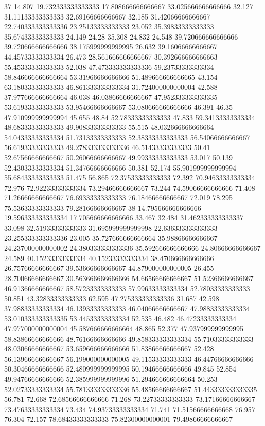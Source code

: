 37 14.807 19.732333333333333 17.808666666666667 33.025666666666666 32.127 31.11133333333333 32.69166666666667 32.185 31.42066666666667 22.740333333333336 23.25133333333333 23.052 35.39833333333333 35.67433333333333 24.149 24.28 35.308 24.832 24.548 39.720666666666666 39.720666666666666 38.175999999999995 26.632 39.16066666666667 44.45733333333334 26.473 28.561666666666667 30.392666666666663 55.45333333333333 52.038 47.473333333333336 59.23733333333334 58.846666666666664 53.31966666666666 51.489666666666665 43.154 63.18033333333333 46.861333333333334 31.724000000000004 42.588 37.977666666666664 46.038 46.03866666666667 47.952333333333335 53.61933333333333 53.95466666666667 53.080666666666666 46.391 46.35 47.910999999999994 45.655 48.84 52.78333333333333 47.833 59.34133333333334 48.68333333333333 49.90833333333333 55.515 48.032666666666664 54.04333333333334 51.73133333333333 52.38333333333333 56.54066666666667 56.61933333333333 49.278333333333336 46.51433333333333 50.41 52.67566666666667 50.26066666666667 49.99333333333333 53.017 50.139 52.43033333333334 51.34766666666666 50.381 52.174 55.901999999999994 55.68433333333333 51.475 56.865 72.37533333333333 72.392 70.94633333333334 72.976 72.92233333333334 73.29466666666667 73.244 74.59066666666666 71.408 71.26666666666667 76.69333333333333 76.18466666666667 72.019 78.295 75.53633333333333 79.28166666666667
38 14.795666666666666 19.596333333333334 17.705666666666666 33.467 32.484 31.462333333333337 33.098 32.51933333333333 31.695999999999998 22.636333333333333 23.255333333333336 23.005 35.727666666666664 35.98866666666667 24.237000000000002 24.380333333333336 35.592666666666666 24.80666666666667 24.589 40.15233333333334 40.15233333333334 38.470666666666666 26.75766666666667 39.53666666666667 44.879000000000005 26.455 28.70066666666667 30.563666666666666 54.66566666666667 51.52366666666667 46.91366666666667 58.57233333333333 57.99633333333334 52.78033333333333 50.851 43.32833333333333 62.595 47.275333333333336 31.687 42.598 37.98833333333334 46.13933333333333 46.04066666666667 47.98833333333334 53.010333333333335 53.44533333333334 52.535 46.482 46.47233333333334 47.977000000000004 45.587666666666664 48.865 52.377 47.937999999999995 58.83866666666666 48.76166666666666 49.858333333333334 55.71033333333333 48.03066666666667 53.659666666666666 51.83866666666667 52.428 56.13966666666667 56.199000000000005 49.11533333333333 46.44766666666666 50.30466666666666 52.480999999999995 50.19466666666666 49.845 52.854 49.94766666666666 52.385999999999996 51.294666666666664 50.253 52.02733333333334 55.781333333333336 55.48566666666667 51.443333333333335 56.781 72.668 72.68566666666666 71.268 73.22733333333333 73.17166666666667 73.47633333333334 73.434 74.93733333333334 71.741 71.51566666666668 76.957 76.304 72.157 78.68433333333333 75.82300000000001 79.49866666666667
